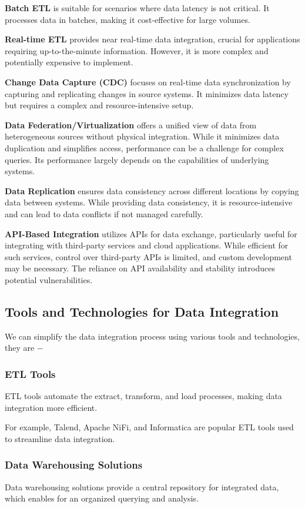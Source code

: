 \documentclass[12pt]{book}
\begin{document}
\noindent \textbf{Batch ETL} is suitable for scenarios where data latency is not critical. It processes data in batches, making it cost-effective for large volumes.

\noindent \textbf{Real-time ETL} provides near real-time data integration, crucial for applications requiring up-to-the-minute information. However, it is more complex and potentially expensive to implement.

\noindent \textbf{Change Data Capture (CDC)} focuses on real-time data synchronization by capturing and replicating changes in source systems. It minimizes data latency but requires a complex and resource-intensive setup.

\noindent \textbf{Data Federation/Virtualization} offers a unified view of data from heterogeneous sources without physical integration. While it minimizes data duplication and simplifies access, performance can be a challenge for complex queries. Its performance largely depends on the capabilities of underlying systems.

\noindent \textbf{Data Replication} ensures data consistency across different locations by copying data between systems.  While providing data consistency, it is resource-intensive and can lead to data conflicts if not managed carefully.

\noindent \textbf{API-Based Integration} utilizes APIs for data exchange, particularly useful for integrating with third-party services and cloud applications. While efficient for such services, control over third-party APIs is limited, and custom development may be necessary. The reliance on API availability and stability introduces potential vulnerabilities.

\subsection{Tools and Technologies for Data Integration}
We can simplify the data integration process using various tools and technologies, they are −

\subsubsection{ETL Tools}
ETL tools automate the extract, transform, and load processes, making data integration more efficient.

For example, Talend, Apache NiFi, and Informatica are popular ETL tools used to streamline data integration.

\subsubsection{Data Warehousing Solutions}
Data warehousing solutions provide a central repository for integrated data, which enables for an organized querying and analysis.
\end{document}

